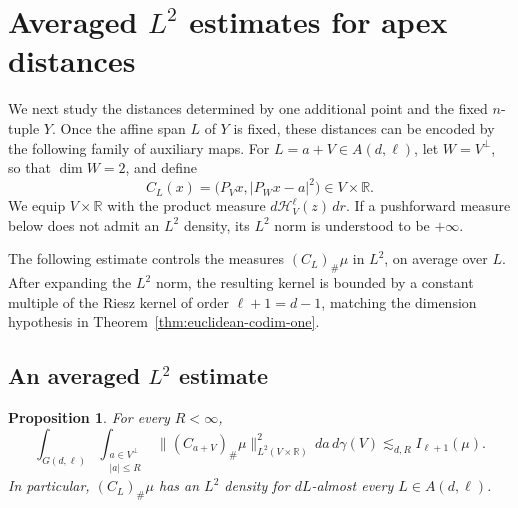 \documentclass[11pt]{article}
\newtheorem{proposition}[theorem]{Proposition}
\theoremstyle{remark}
\newcommand{\R}{\mathbb R}
\newcommand{\cH}{\mathcal H}
\numberwithin{equation}{section}
\newcommand{\1}{\mathbf 1}
\begin{document}
\section{Averaged \texorpdfstring{\(L^2\)}{L2} estimates for apex distances}
\label{sec:cylindrical}

We next study the distances determined by one additional point and the
fixed \(n\)-tuple \(Y\).  Once the affine span \(L\) of \(Y\) is fixed,
these distances can be encoded by the following family of auxiliary
maps.  For
\(L=a+V\in A(d,\ell)\), let \(W=V^\perp\), so that \(\dim W=2\), and define
\begin{equation}
C_L(x)
=
\bigl(P_Vx,\lvert P_Wx-a\rvert^2\bigr)
\in V\times\R.
\label{eq:cylinder-map}
\end{equation}
We equip \(V\times\R\) with the product measure
\(d\cH_V^\ell(z)\,dr\).  If a pushforward measure below does not admit an
\(L^2\) density, its \(L^2\) norm is understood to be \(+\infty\).

The following estimate controls the measures \((C_L)_\#\mu\) in \(L^2\),
on average over \(L\).  After expanding the \(L^2\) norm, the resulting
kernel is bounded by a constant multiple of the Riesz kernel of order
\(\ell+1=d-1\), matching the dimension hypothesis in
Theorem~\ref{thm:euclidean-codim-one}.

\subsection{An averaged \texorpdfstring{\(L^2\)}{L2} estimate}

\begin{proposition}
\label{prop:cylinder-average}
For every \(R<\infty\),
\begin{equation}
\int_{G(d,\ell)}
\int_{\substack{a\in V^\perp\\ \lvert a\rvert\leq R}}
\bigl\lVert(C_{a+V})_\#\mu\bigr\rVert_{L^2(V\times\R)}^2
\,da\,d\gamma(V)
\lesssim_{d,R}
I_{\ell+1}(\mu).
\label{eq:cylinder-average}
\end{equation}
In particular, \((C_L)_\#\mu\) has an \(L^2\) density for
\(dL\)-almost every \(L\in A(d,\ell)\).
\end{proposition}
\end{document}
